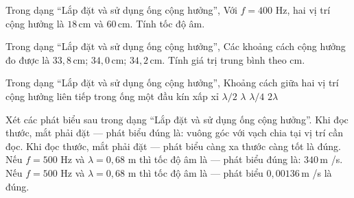 \begin{ex}
Trong dạng “Lắp đặt và sử dụng ống cộng hưởng”, Với $f=400$ Hz, hai vị trí cộng hưởng là $18\,\text{cm}$ và $60\,\text{cm}$. Tính tốc độ âm.
\choiceTF

\end{ex}

\begin{ex}
Trong dạng “Lắp đặt và sử dụng ống cộng hưởng”, Các khoảng cách cộng hưởng đo được là $33,8\,\text{cm}$; $34,0\,\text{cm}$; $34,2\,\text{cm}$. Tính giá trị trung bình theo cm.
\end{ex}

\begin{ex}
Trong dạng “Lắp đặt và sử dụng ống cộng hưởng”, Khoảng cách giữa hai vị trí cộng hưởng liên tiếp trong ống một đầu kín xấp xỉ
\choice
{\True $\lambda/2$}
{$\lambda$}
{$\lambda/4$}
{$2\lambda$}
\end{ex}

\begin{ex}
Xét các phát biểu sau trong dạng “Lắp đặt và sử dụng ống cộng hưởng”.
\choiceTF
{\True Khi đọc thước, mắt phải đặt — phát biểu đúng là: vuông góc với vạch chia tại vị trí cần đọc.}
{Khi đọc thước, mắt phải đặt — phát biểu càng xa thước càng tốt là đúng.}
{\True Nếu $f=500$ Hz và $\lambda=0,68$ m thì tốc độ âm là — phát biểu đúng là: $340\,\text{m}$ /s.}
{Nếu $f=500$ Hz và $\lambda=0,68$ m thì tốc độ âm là — phát biểu $0,00136\,\text{m}$ /s là đúng.}
\end{ex}


